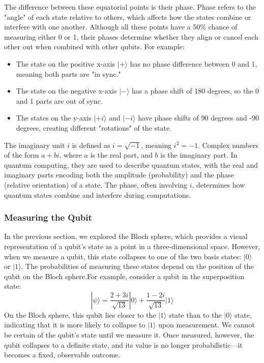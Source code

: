 The difference between these equatorial points is their phase. Phase refers to the "angle" of each state relative to others, which affects how the states combine or interfere with one another. Although all these points have a 50\% chance of measuring either 0 or 1, their phases determine whether they align or cancel each other out when combined with other qubits. For example:
\begin{itemize}
    \item The state on the positive x-axis \( |+\rangle \) has no phase difference between 0 and 1, meaning both parts are "in sync."
    \item The state on the negative x-axis \( |-\rangle \) has a phase shift of 180 degrees, so the 0 and 1 parts are out of sync.
    \item The states on the y-axis \( |+i\rangle \) and \( |-i\rangle \) have phase shifts of 90 degrees and -90 degrees, creating different "rotations" of the state.
\end{itemize} 
\vspace{0.1cm}

\begin{tcolorbox}[colback=gray!5!white, colframe=gray!75!black, title=Note on \(i\)]
The imaginary unit \( i \) is defined as \( i = \sqrt{-1} \), meaning \( i^2 = -1 \). Complex numbers  of the form \( a + bi \), where \( a \) is the real part, and \( b \) is the imaginary part. In quantum computing, they are used to describe quantum states, with the real and imaginary parts encoding both the amplitude (probability) and the phase (relative orientation) of a state. The phase, often involving \( i \), determines how quantum states combine and interfere during computations.
\end{tcolorbox}


\subsubsection*{Measuring the Qubit}

In the previous section, we explored the Bloch sphere, which provides a visual representation of a qubit's state as a point in a three-dimensional space. However, when we measure a qubit, this state collapses to one of the two basis states: \( |0\rangle \) or \( |1\rangle \). The probabilities of measuring these states depend on the position of the qubit on the Bloch sphere.For example,  consider a qubit in the superposition state:
\vspace{0.1em}
\[
|\psi\rangle = \frac{2 + 3i}{\sqrt{13}} |0\rangle + \frac{1 - 2i}{\sqrt{13}} |1\rangle
\]
\vspace{0.1em}On the Bloch sphere, this qubit lies closer to the \( |1\rangle \) state than to the \( |0\rangle \) state, indicating that it is more likely to collapse to \( |1\rangle \) upon measurement. We cannot be certain of the qubit's state until we measure it. Once measured, however, the qubit collapses to a definite state, and its value is no longer probabilistic—it becomes a fixed, observable outcome.


